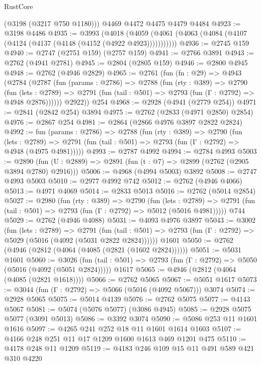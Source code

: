 \begin{lexlean}{RustCore}
\begin{coremodule}
      (@3198 (@3217 @750 @1180)))
    @4469
    @4472
    @4475
    @4479
    @4484
@4923 := @3198 @4486
@4935 := @3993
    (@4018 (@4059 (@4061 (@4063 (@4084 (@4107 (@4124 (@4137 (@4148 (@4152 (@4922 @4923)))))))))))
@4936 := @2745 @159
@4940 := @2747 (@2751 @159) (@2757 @159)
@4941 := @2766 @3891
@4943 := @2762 (@4941 @2781)
@4945 := @2804 (@2805 @159)
@4946 := @2800 @4945
@4948 := @2762 (@4946 @2829)
@4965 := @2761
    (fun (fn : @29) =>
    @4943
      (@2784
        (@2787
          (fun (params : @2786) =>
          @2788
            (fun (rty : @389) =>
            @2790
              (fun (lets : @2789) =>
              @2791 (fun (tail : @501) => @2793 (fun (Γ : @2792) => @4948 @2876))))))
        @2922))
    @254
@4968 := @2928 (@4941 (@2779 @254))
@4971 := @2841 (@2842 @254) @3894
@4975 := @2762 (@2833 (@4971 @2850) @2854)
@4976 := @2867 @254
@4981 := @2864 (@2866 @4976 @3897 @2822 @2824)
@4992 := fun (params : @2786) =>
  @2788
    (fun (rty : @389) =>
    @2790
      (fun (lets : @2789) =>
      @2791 (fun (tail : @501) => @2793 (fun (Γ : @2792) => @4948 (@4975 @4981)))))
@4993 := @2787 @4992
@4994 := @2784 @4993
@5003 := @2890 (fun (U : @2889) => @2891 (fun (t : @7) => @2899 (@2762 (@2905 @3894 @2780) @2916)))
@5006 := @4968 (@4994 @5003) @3892
@5008 := @2747 @4993 @5003
@5010 := @2977 @4992 @742
@5012 := @2762 (@4946 @4066)
@5013 := @4971 @4069
@5014 := @2833 @5013
@5016 := @2762 (@5014 @2854)
@5027 := @2980
    (fun (rty : @389) =>
    @2790
      (fun (lets : @2789) =>
      @2791 (fun (tail : @501) => @2793 (fun (Γ : @2792) => @5012 (@5016 @4981)))))
    @744
@5029 := @2762 (@4946 @4088)
@5031 := @4093 @4976 @3897
@5043 := @3002
    (fun (lets : @2789) =>
    @2791
      (fun (tail : @501) => @2793 (fun (Γ : @2792) => @5029 (@5016 (@4092 (@5031 @2822 @2824))))))
    @1601
@5050 := @2762 (@4946 (@2812 (@4064 (@4085 (@2821 (@1602 @2824))))))
@5051 := @5031 @1601
@5060 := @3026
    (fun (tail : @501) => @2793 (fun (Γ : @2792) => @5050 (@5016 (@4092 (@5051 @2824)))))
    @1617
@5065 := @4946 (@2812 (@4064 (@4085 (@2821 @1618))))
@5066 := @2762 @5065
@5067 := @5051 @1617
@5073 := @3044 (fun (Γ : @2792) => @5066 (@5016 (@4092 @5067))) @3074
@5074 := @2928 @5065
@5075 := @5014 @4139
@5076 := @2762 @5075
@5077 := @4143 @5067
@5081 := @5074 (@5076 @5077) (@3086 @4945)
@5085 := @2928 @5075 @5077 (@3091 @5013)
@5086 := @3392 @3074
@5090 := @5086 @253 @11 @1601 @1616
@5097 := @4265 @241 @252 @18 @11 @1601 @1614 @1603
@5107 := @4166 @248 @251 @11 @17 @1209 @1600 @1613 @469 @1201 @475
@5110 := @4178 @248 @11 @1209
@5119 := @4183 @246 @109 @15 @11 @491 @589 @421 @310 @4220

\end{coremodule}
\end{lexlean}
